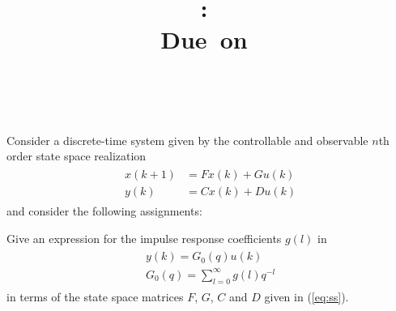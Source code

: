 \documentclass{report} %
\title{\vspace{2in}\textmd{\textbf{\hmwkClass:\ \hmwkTitle\ifthenelse{\equal{\hmwkSubTitle}{}}{}{\\\hmwkSubTitle}}}\\\normalsize\vspace{0.1in}\small{Due\ on\ \hmwkDueDate}\\\vspace{0.1in}\large{\textit{\hmwkClassInstructor\ \hmwkClassTime}}\vspace{3in}}
\date{}
\author{\hmwkAuthor}
\begin{document}
\begin{spacing}{1.1}
\maketitle
%

\newpage
\thispagestyle{empty}
\mbox{}
\newpage
{}

\begin{homeworkProblem}
Consider a discrete-time system given by the controllable and observable $n$th order state space realization
\begin{align}
\label{eq:ss}
\begin{split}
x(k+1) &= Fx(k)+Gu(k) \\
y(k) &= Cx(k) + Du(k)
\end{split}
\end{align}
and consider the following assignments:

\begin{homeworkSection}{1.1}
Give an expression for the impulse response coefficients $g(l)$ in
\begin{align}
\begin{split}
y(k) = G_0(q)u(k) \\
G_0(q) = \sum_{l=0}^\infty g(l)q^{-l}
\end{split}
\end{align}
in terms of the state space matrices $F$, $G$, $C$ and $D$ given in (\ref{eq:ss}).
\newline
{}
\end{homeworkSection}


\end{homeworkProblem}
\end{spacing}
\end{document}
